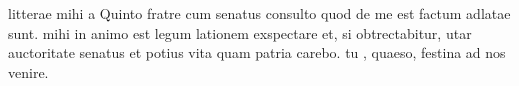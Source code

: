 


 litterae mihi a Quinto fratre cum senatus consulto quod de me est factum adlatae sunt. mihi in animo est legum lationem exspectare et, si obtrectabitur, utar auctoritate senatus et potius vita quam patria carebo. tu , quaeso, festina ad nos venire.
